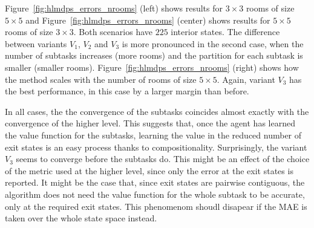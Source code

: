 Figure~\ref{fig:hlmdps_errors_nrooms} (left) shows results for $3\times 3$ rooms of size $5\times 5$ and Figure~\ref{fig:hlmdps_errors_nrooms} (center) shows results for $5\times 5$ rooms of size $3\times 3$. Both scenarios have $225$ interior states.
The difference between variants $V_1$, $V_2$ and $V_3$ is more pronounced in the second case, when the number of subtasks increases (more rooms) and the partition for each subtask is smaller (smaller rooms). Figure~\ref{fig:hlmdps_errors_nrooms} (right) shows how the method scales with the number of rooms of size $5\times 5$.
Again, variant $V_3$ has the best performance, in this case by a larger 
margin than before.

In all cases, the the convergence of the subtasks coincides almost exactly with the convergence of the higher level. This suggests that, once the agent has learned the value function for the subtasks, learning the value in the reduced number of exit states is an easy process thanks to compositionality. Surprisingly, the variant $V_3$ seems to converge before the subtasks do. This might be an effect of the choice of the metric used at the higher level, since only the error at the exit states is reported. It might be the case that, since exit states are pairwise contiguous, the algorithm does not need the value function for the whole subtask to be accurate, only at the required exit states. This phenomenom shoudl disapear if the MAE is taken over the whole state space instead.






